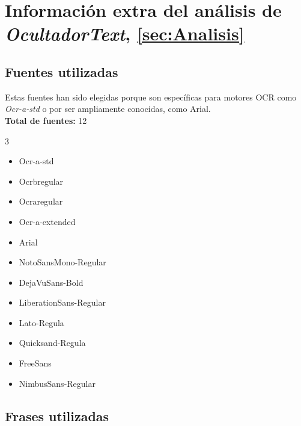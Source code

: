 \chapter{Información extra del análisis de \textit{OcultadorText}, \ref{sec:Analisis}}
\label{Appendix:Fuentes}

\section{Fuentes utilizadas}
Estas fuentes han sido elegidas porque son específicas para motores OCR como \textit{Ocr-a-std} o por ser ampliamente conocidas, como Arial.\\
\textbf{Total de fuentes:} 12

\vspace{1em}

\begin{multicols}{3}
 \begin{itemize}
        \item Ocr-a-std
        \item Ocrbregular
        \item Ocraregular
        \item Ocr-a-extended
        \item Arial
        \item NotoSansMono-Regular
        \item DejaVuSans-Bold
        \item LiberationSans-Regular
        \item Lato-Regula
        \item Quicksand-Regula
        \item FreeSans
        \item NimbusSans-Regular
\end{itemize}
\end{multicols}

\section{Frases utilizadas}

